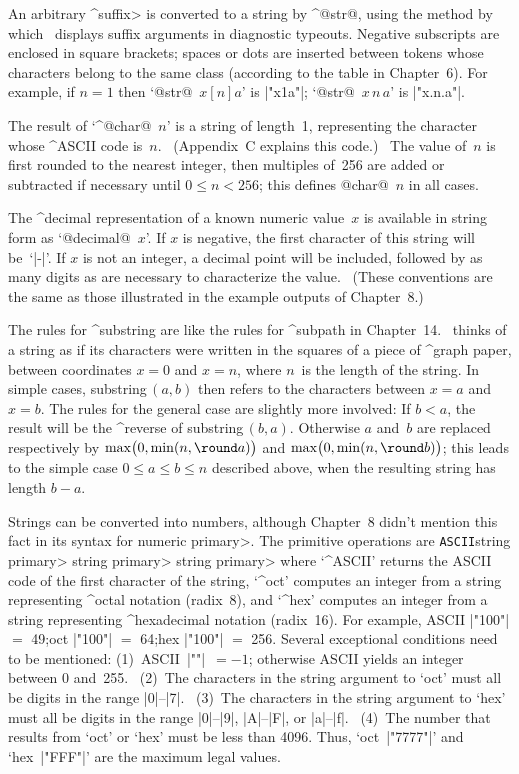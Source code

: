 \ddanger An arbitrary ^\<suffix> is converted to a string by ^@str@,
using the method by which \MF\ displays suffix arguments in
diagnostic typeouts. Negative subscripts are enclosed in
square brackets; spaces or dots are inserted between tokens whose
characters belong to the same class (according to the table in
Chapter~6). For example, if $n=1$ then `@str@~$x[n]a$' is |"x1a"|;
`@str@~$x\,n\,a$' is |"x.n.a"|.

\ddanger The result of `^@char@~$n$' is a string of length~1,
representing the character whose ^{ASCII} code is~$n$.
\ (Appendix~C explains this code.) \ The value of~$n$ is first
rounded to the nearest integer, then multiples of~256 are
added or subtracted if necessary until $0\le n<256$; this
defines @char@~$n$ in all cases.

\ddanger The ^{decimal representation} of a known numeric value~$x$
is available in string form as `@decimal@~$x$'. If $x$ is negative,
the first character of this string will be~`|-|'. If $x$ is not
an integer, a decimal point will be included, followed by as
many digits as are necessary to characterize the value. \ (These
conventions are the same as those illustrated in the example
outputs of Chapter~8.)

\ddanger The rules for ^{substring} are like the rules for ^{subpath}
in Chapter~14. \MF\ thinks of a string as if its characters were
written in the squares of a piece of ^{graph paper}, between
coordinates $x=0$ and $x=n$, where $n$~is the length of the string.
In simple cases, substring$\,(a,b)$
then refers to the characters between $x=a$ and~$x=b$. The
rules for the general case are slightly more involved: If $b<a$,
the result will be the ^{reverse} of substring$\,(b,a)$.
Otherwise $a$ and~$b$ are replaced respectively by
$\max\bigl(0,\min(n,\round a)\bigr)$ and
$\max\bigl(0,\min(n,\round b)\bigr)$; this leads to the simple
case $0\le a\le b\le n$ described above, when the resulting
string has length $b-a$.

\ddanger Strings can be converted into numbers, although Chapter~8
didn't mention this fact in its syntax for \<numeric primary>. The
primitive operations are
\begindisplay
{\tt ASCII}\thinspace\<string primary>\alt
{}\thinspace\<string primary>\alt
{}\thinspace\<string primary>
\enddisplay
where `^{ASCII}' returns the ASCII code of the first character of the
string, `^{oct}' computes an integer from a string representing
^{octal notation} (radix~8), and `^{hex}' computes an integer from
a string representing ^{hexadecimal notation} (radix~16). For example,
\begindisplay
ASCII |"100"| $=$ 49;\qquad oct |"100"| $=$ 64;\qquad hex |"100"| $=$ 256.
\enddisplay
Several exceptional conditions need to be mentioned:
(1)~ASCII~|""|~$=-1$; otherwise ASCII yields an integer between 0 and~255.
\ (2)~The characters in the string argument to `oct' must all be
digits in the range |0|--|7|.
\ (3)~The characters in the string argument to `hex' must all be
digits in the range |0|--|9|, |A|--|F|, or |a|--|f|.
\ (4)~The number that results from `oct' or `hex' must be less than 4096.
Thus, `oct~|"7777"|' and `hex~|"FFF"|' are the maximum legal values.

